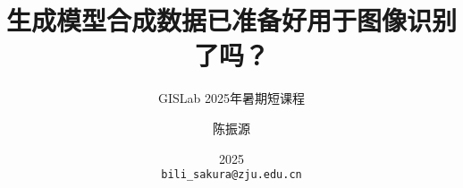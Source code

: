 \documentclass[aspectratio=169]{beamer}
\title[]{生成模型合成数据已准备好用于图像识别了吗？}
\subtitle{GISLab 2025年暑期短课程}
\author[Sakura]{陈振源}
\institute[ZJU]{浙江大学地球科学学院}
\date{2025\\\small\texttt{bili\_sakura@zju.edu.cn}}
\begin{document}
\begin{frame}
  \titlepage
\end{frame}


\end{document}
